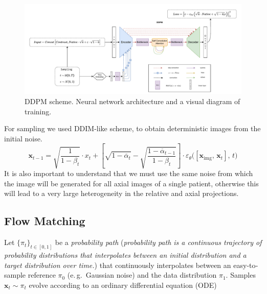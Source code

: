 \documentclass{article}
\begin{document}
\begin{figure}[h!]
  \centering
  \includegraphics[width=\linewidth]{images/DDPM.pdf}
  \caption{DDPM scheme. Neural network architecture and a visual diagram of training.}
\end{figure}


For sampling we used DDIM-like scheme, to obtain deterministic images from the initial noise.
\begin{equation*}
    \mathbf{x}_{t-1}      =  \sqrt{\frac{1}{1-\beta_t}} \cdot x_t + \left[\sqrt{1-\overline{\alpha}_t} - \sqrt{\frac{1-\overline{\alpha}_{t-1}}{1-\beta_t}} \right] \cdot \varepsilon_\theta\bigl([\mathbf{x}_{\mathrm{img}},\,\mathbf{x}_{t}],\,t\bigr)  
\end{equation*}
It is also important to understand that we must use the same noise from which the image will be generated for all axial images of a single patient, otherwise this will lead to a very large heterogeneity in the relative and axial projections.
  
\subsection{Flow Matching}
\label{sec:fm_math}
Let $\{\pi_{t}\}_{t\in[0,1]}$ be a \emph{probability
path} (\emph{probability path is a continuous trajectory of probability distributions that interpolates between an initial distribution and a target distribution over time.}) that continuously interpolates between an easy‐to‐sample
reference $\pi_{0}$ (e.\,g.\ Gaussian noise) and the data distribution
$\pi_{1}$.
Samples $\mathbf{x}_{t}\!\sim\!\pi_{t}$ evolve according to an ordinary
differential equation (ODE)
\end{document}
